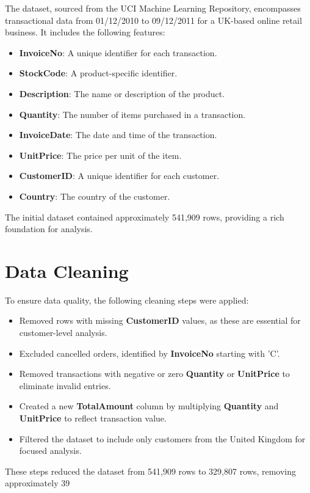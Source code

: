 \documentclass[a4paper,12pt]{article}
\begin{document}
The dataset, sourced from the UCI Machine Learning Repository, encompasses transactional data from 01/12/2010 to 09/12/2011 for a UK-based online retail business. It includes the following features:
\begin{itemize}
    \item \textbf{InvoiceNo}: A unique identifier for each transaction.
    \item \textbf{StockCode}: A product-specific identifier.
    \item \textbf{Description}: The name or description of the product.
    \item \textbf{Quantity}: The number of items purchased in a transaction.
    \item \textbf{InvoiceDate}: The date and time of the transaction.
    \item \textbf{UnitPrice}: The price per unit of the item.
    \item \textbf{CustomerID}: A unique identifier for each customer.
    \item \textbf{Country}: The country of the customer.
\end{itemize}
The initial dataset contained approximately 541,909 rows, providing a rich foundation for analysis.

\section{Data Cleaning}

To ensure data quality, the following cleaning steps were applied:
\begin{itemize}
    \item Removed rows with missing \textbf{CustomerID} values, as these are essential for customer-level analysis.
    \item Excluded cancelled orders, identified by \textbf{InvoiceNo} starting with 'C'.
    \item Removed transactions with negative or zero \textbf{Quantity} or \textbf{UnitPrice} to eliminate invalid entries.
    \item Created a new \textbf{TotalAmount} column by multiplying \textbf{Quantity} and \textbf{UnitPrice} to reflect transaction value.
    \item Filtered the dataset to include only customers from the United Kingdom for focused analysis.
\end{itemize}
These steps reduced the dataset from 541,909 rows to 329,807 rows, removing approximately 39%
\end{document}
